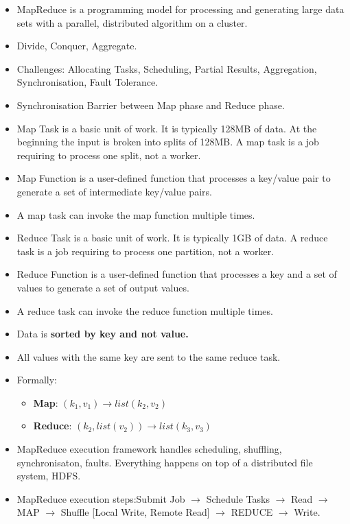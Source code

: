 \documentclass[10pt, landscape]{article}
\begin{document}
\begin{multicols*}{4}
  \begin{itemize}
    \item MapReduce is a programming model for processing and generating large data sets with a parallel, distributed algorithm on a cluster.
    \item Divide, Conquer, Aggregate.
    \item Challenges: Allocating Tasks, Scheduling, Partial Results, Aggregation, Synchronisation, Fault Tolerance.
    \item Synchronisation Barrier between Map phase and Reduce phase.
    \item Map Task is a basic unit of work. It is typically 128MB of data. At the beginning the input is broken into splits of 128MB. A map task is a job requiring to process one split, not a worker.
    \item Map Function is a user-defined function that processes a key/value pair to generate a set of intermediate key/value pairs.
    \item A map task can invoke the map function multiple times.
    \item Reduce Task is a basic unit of work. It is typically 1GB of data. A reduce task is a job requiring to process one partition, not a worker.
    \item Reduce Function is a user-defined function that processes a key and a set of values to generate a set of output values.
    \item A reduce task can invoke the reduce function multiple times.
    \item Data is \textbf{sorted by key and not value.}
    \item All values with the same key are sent to the same reduce task.
    \item Formally:
    \begin{itemize}
      \item \textbf{Map}: $(k_1, v_1) \rightarrow list(k_2, v_2)$
      \item \textbf{Reduce}: $(k_2, list(v_2)) \rightarrow list(k_3, v_3)$
    \end{itemize}
    \item MapReduce execution framework handles scheduling, shuffling, synchronisaton, faults. Everything happens on top of a distributed file system, HDFS.
    \item MapReduce execution steps:\newline Submit Job $\rightarrow$ Schedule Tasks $\rightarrow$ Read $\rightarrow$ MAP $\rightarrow$ Shuffle [Local Write, Remote Read] $\rightarrow$ REDUCE $\rightarrow$ Write.

\end{itemize}
\end{multicols*}
\end{document}
